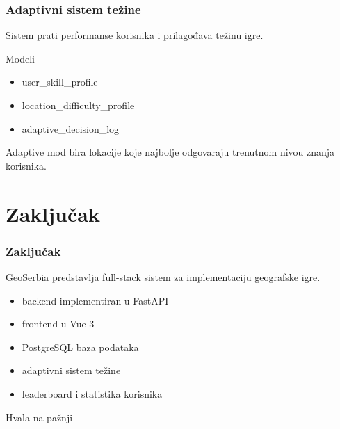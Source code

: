 \documentclass{beamer}
\begin{document}
\begin{frame}
\frametitle{Adaptivni sistem težine}

Sistem prati performanse korisnika i prilagođava težinu igre.

\begin{block}{Modeli}
\begin{itemize}
\item user\_skill\_profile
\item location\_difficulty\_profile
\item adaptive\_decision\_log
\end{itemize}
\end{block}

Adaptive mod bira lokacije koje najbolje odgovaraju
trenutnom nivou znanja korisnika.

\end{frame}

\section{Zaključak}

\begin{frame}
\frametitle{Zaključak}

GeoSerbia predstavlja full-stack sistem za implementaciju
geografske igre.

\begin{itemize}

\item backend implementiran u FastAPI
\item frontend u Vue 3
\item PostgreSQL baza podataka
\item adaptivni sistem težine
\item leaderboard i statistika korisnika

\end{itemize}

\end{frame}


\begin{frame}
\centering
\Huge Hvala na pažnji
\end{frame}
\end{document}
